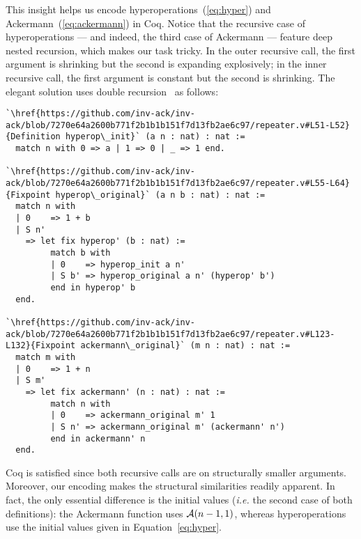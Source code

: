This insight helps us encode hyperoperations~(\ref{eq:hyper}) and
Ackermann~(\ref{eq:ackermann}) in Coq.  Notice that the recursive case of hyperoperations --- and
indeed, the third case of Ackermann --- feature deep nested recursion, 
which makes our task tricky. 
In the outer recursive call, the first argument is shrinking
but the second is expanding explosively; in the inner recursive call, the first argument is
constant but the second is shrinking. The elegant solution uses double recursion~\cite{bertotcast} as follows:
\begin{lstlisting}
`\href{https://github.com/inv-ack/inv-ack/blob/7270e64a2600b771f2b1b1b151f7d13fb2ae6c97/repeater.v#L51-L52}{Definition hyperop\_init}` (a n : nat) : nat :=
  match n with 0 => a | 1 => 0 | _ => 1 end.

`\href{https://github.com/inv-ack/inv-ack/blob/7270e64a2600b771f2b1b1b151f7d13fb2ae6c97/repeater.v#L55-L64}{Fixpoint hyperop\_original}` (a n b : nat) : nat :=
  match n with
  | 0    => 1 + b
  | S n'
    => let fix hyperop' (b : nat) :=
         match b with
         | 0    => hyperop_init a n'
         | S b' => hyperop_original a n' (hyperop' b')
         end in hyperop' b
  end.

`\href{https://github.com/inv-ack/inv-ack/blob/7270e64a2600b771f2b1b1b151f7d13fb2ae6c97/repeater.v#L123-L132}{Fixpoint ackermann\_original}` (m n : nat) : nat :=
  match m with
  | 0    => 1 + n
  | S m'
    => let fix ackermann' (n : nat) : nat :=
         match n with
         | 0    => ackermann_original m' 1
         | S n' => ackermann_original m' (ackermann' n')
         end in ackermann' n
  end.
\end{lstlisting}
Coq is satisfied since both recursive calls are on structurally smaller arguments.
Moreover, our encoding makes the structural similarities
 readily apparent.  In fact, the only essential difference is the initial values
(\emph{i.e.} the second case of both definitions): the Ackermann function uses $\mathcal{A}(n-1,1)$, whereas
hyperoperations use the initial values given in Equation~\ref{eq:hyper}.

